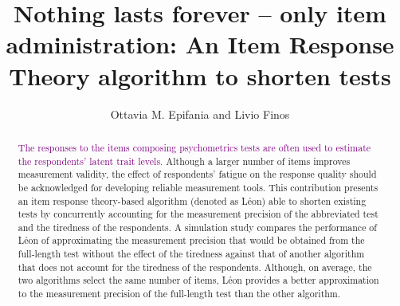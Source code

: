 \documentclass{svproc}
\newcommand{\ottavia}[1]{\textcolor{purple}{#1}}
\begin{document}
\mainmatter              %
%
\title{Nothing lasts forever -- only item administration: An Item Response Theory algorithm to shorten tests}
%
%
\author{Ottavia M. Epifania and Livio Finos}
%
%
%

\maketitle              %

\begin{abstract} 
	\ottavia{The responses to the items composing psychometrics tests are often used to estimate the respondents' latent trait levels.}
Although a larger number of items improves measurement validity, the effect of respondents’ fatigue on the response quality should be acknowledged for developing reliable measurement tools.  This contribution presents an item response theory-based algorithm (denoted as Léon) able to shorten existing tests by concurrently accounting for the measurement precision of the abbreviated test and the tiredness of the respondents. A simulation study compares the performance of Léon of approximating the measurement precision that would be obtained from the full-length test without the effect of the tiredness against that of another algorithm that does not account for the tiredness of the respondents. Although, on average, the two algorithms select the same number of items, Léon provides a better approximation to the measurement precision of the full-length test than the other algorithm.  
\end{abstract}
%
\end{document}
